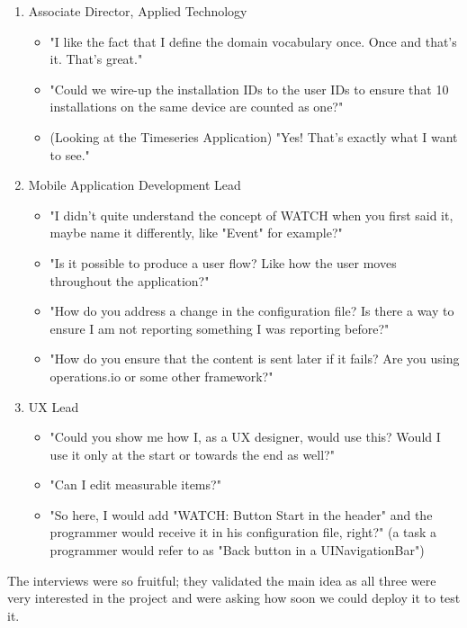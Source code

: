 \begin{enumerate}
		\item Associate Director, Applied Technology
		\begin{itemize}
				\item[] "I like the fact that I define the domain vocabulary once. Once and that's it. That's great."
				\item[] "Could we wire-up the installation IDs to the user IDs to ensure that 10 installations on the same device are counted as one?"
				\item[] (Looking at the Timeseries Application) "Yes! That's exactly what I want to see."
		\end{itemize}			
		
		\item Mobile Application Development Lead
		\begin{itemize}
				\item[] "I didn't quite understand the concept of WATCH when you first said it, maybe name it differently, like "Event" for example?"
				\item[] "Is it possible to produce a user flow? Like how the user moves throughout the application?"
				\item[] "How do you address a change in the configuration file? Is there a way to ensure I am not reporting something I was reporting before?"
				\item[] "How do you ensure that the content is sent later if it fails? Are you using operations.io or some other framework?"
		\end{itemize}
		
		\item UX Lead
		\begin{itemize}
				\item[] "Could you show me how I, as a UX designer, would use this? Would I use it only at the start or towards the end as well?"
				\item[] "Can I edit measurable items?"
				\item[] "So here, I would add "WATCH: Button Start in the header" and the programmer would receive it in his configuration file, right?" (a task a programmer would refer to as "Back button in a UINavigationBar")
		\end{itemize}
\end{enumerate}

The interviews were so fruitful; they validated the main idea as all three were very interested in the project and were asking how soon we could deploy it to test it. 

